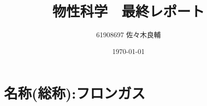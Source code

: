\documentclass[uplatex,a4j,10.5pt]{jsarticle}
\begin{document}
\title{物性科学　最終レポート}
\author{61908697 佐々木良輔}
\date{\today}
\maketitle
\section*{名称(総称):フロンガス}





\end{document}
